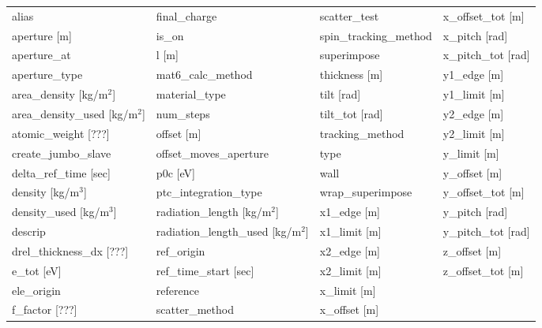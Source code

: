  \begin{tabular}{llll} \toprule
alias                            & final_charge                     & scatter_test                     & x_offset_tot [m]                 \\
aperture [m]                     & is_on                            & spin_tracking_method             & x_pitch [rad]                    \\
aperture_at                      & l [m]                            & superimpose                      & x_pitch_tot [rad]                \\
aperture_type                    & mat6_calc_method                 & thickness [m]                    & y1_edge [m]                      \\
area_density [kg/m$^2$]          & material_type                    & tilt [rad]                       & y1_limit [m]                     \\
area_density_used [kg/m$^2$]     & num_steps                        & tilt_tot [rad]                   & y2_edge [m]                      \\
atomic_weight [???]              & offset [m]                       & tracking_method                  & y2_limit [m]                     \\
create_jumbo_slave               & offset_moves_aperture            & type                             & y_limit [m]                      \\
delta_ref_time [sec]             & p0c [eV]                         & wall                             & y_offset [m]                     \\
density [kg/m$^3$]               & ptc_integration_type             & wrap_superimpose                 & y_offset_tot [m]                 \\
density_used [kg/m$^3$]          & radiation_length [kg/m$^2$]      & x1_edge [m]                      & y_pitch [rad]                    \\
descrip                          & radiation_length_used [kg/m$^2$] & x1_limit [m]                     & y_pitch_tot [rad]                \\
drel_thickness_dx [???]          & ref_origin                       & x2_edge [m]                      & z_offset [m]                     \\
e_tot [eV]                       & ref_time_start [sec]             & x2_limit [m]                     & z_offset_tot [m]                 \\
ele_origin                       & reference                        & x_limit [m]                      &                                  \\
f_factor [???]                   & scatter_method                   & x_offset [m]                     &                                  \\
 \bottomrule
 \end{tabular}
 \vfill
 
